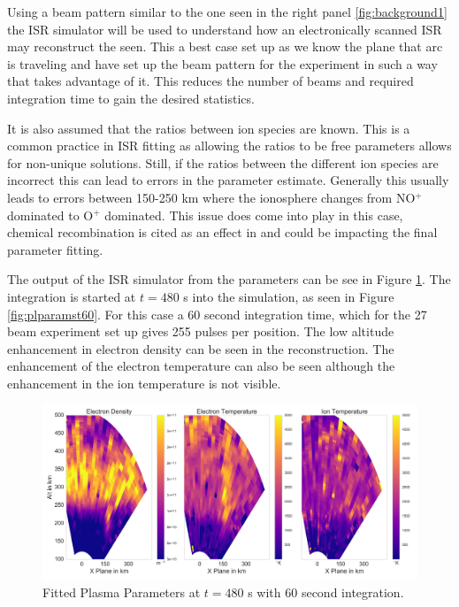 \documentclass[draft,ras]{agutex}
\begin{document}
\begin{article}
Using a beam pattern similar to the one seen in the right panel \ref{fig:background1} the ISR simulator will be used to understand how an electronically scanned ISR may reconstruct the seen. This a best case set up as we know the plane that arc is traveling and have set up the beam pattern for the experiment in such a way that takes advantage of it. This reduces the number of beams and required integration time to gain the desired statistics. 

It is also assumed that the ratios between ion species are known. This is a common practice in ISR fitting as allowing the ratios to be free parameters allows for non-unique solutions. Still, if the ratios between the different ion species are incorrect this can lead to errors in the parameter estimate. Generally this usually leads to errors between 150-250 km where the ionosphere changes from NO$^+$ dominated to O$^+$ dominated. This issue does come into play in this case, chemical recombination is cited as an effect in \citet{Perry:2015jf} and could be impacting the final parameter fitting.


The output of the ISR simulator from the parameters can be see in Figure \ref{fig:fplparamst60}. The integration is started at $t=480$ s into the simulation, as seen in Figure \ref{fig:plparamst60}. For this case a 60 second integration time, which for the 27 beam experiment set up gives 255 pulses per position. The low altitude enhancement in electron density can be seen in the reconstruction. The enhancement of the electron temperature can also be seen although the enhancement in the ion temperature is not visible.



\begin{figure}[!t]
\centering
\includegraphics[width=5in]{0480_60_int}
\caption{Fitted Plasma Parameters at $t=480$ s with 60 second integration.}
\label{fig:fplparamst60}
\end{figure}


\end{article}
\end{document}
